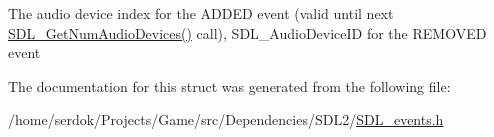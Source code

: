 The audio device index for the A\+D\+D\+ED event (valid until next \hyperlink{SDL__audio_8h_ae165f64b3f0fecfebe1c97731600ca59}{S\+D\+L\+\_\+\+Get\+Num\+Audio\+Devices()} call), S\+D\+L\+\_\+\+Audio\+Device\+ID for the R\+E\+M\+O\+V\+ED event 

The documentation for this struct was generated from the following file\+:\begin{DoxyCompactItemize}
\item 
/home/serdok/\+Projects/\+Game/src/\+Dependencies/\+S\+D\+L2/\hyperlink{SDL__events_8h}{S\+D\+L\+\_\+events.\+h}\end{DoxyCompactItemize}
